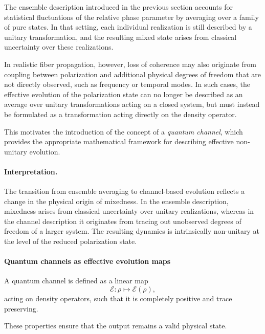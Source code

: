 \documentclass[a4paper]{article}
\begin{document}
The ensemble description introduced in the previous section accounts for statistical fluctuations of the relative phase parameter by averaging over a family of pure states. In that setting, each individual realization is still described by a unitary transformation, and the resulting mixed state arises from classical uncertainty over these realizations.

\medskip

In realistic fiber propagation, however, loss of coherence may also originate from coupling between polarization and additional physical degrees of freedom that are not directly observed, such as frequency or temporal modes. In such cases, the effective evolution of the polarization state can no longer be described as an average over unitary transformations acting on a closed system, but must instead be formulated as a transformation acting directly on the density operator.

\medskip

This motivates the introduction of the concept of a \emph{quantum channel}, which provides the appropriate mathematical framework for describing effective non-unitary evolution.

\medskip

\paragraph{Interpretation.}

The transition from ensemble averaging to channel-based evolution reflects a change in the physical origin of mixedness. In the ensemble description, mixedness arises from classical uncertainty over unitary realizations, whereas in the channel description it originates from tracing out unobserved degrees of freedom of a larger system. The resulting dynamics is intrinsically non-unitary at the level of the reduced polarization state.

\medskip

\paragraph{Quantum channels as effective evolution maps}

A quantum channel is defined as a linear map
\[
\mathcal{E} : \rho \mapsto \mathcal{E}(\rho),
\]
acting on density operators, such that it is completely positive and trace preserving.

These properties ensure that the output remains a valid physical state.
\end{document}
